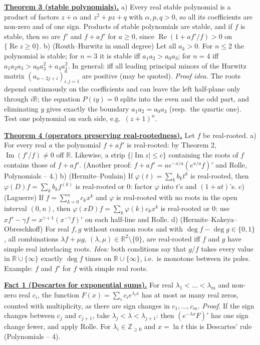 \documentclass[11pt,a4paper]{article}
\newcommand{\head}[1]{\par\medskip\noindent\textbf{\underline{#1}}\quad}
\begin{document}
\head{Theorem 3 (stable polynomials).} a) Every real stable polynomial is a product of factors
$z+\alpha$ and $z^2+pz+q$ with $\alpha,p,q>0$, so all its coefficients are non-zero and of one sign.
Products of stable polynomials are stable, and if $f$ is stable, then so are $f'$ and $f+af'$ for
$a\ge0$, since $\operatorname{Re}(1+af'/f)>0$ on $\{\operatorname{Re}z\ge0\}$.
b) (Routh--Hurwitz in small degree) Let all $a_k>0$. For $n\le2$ the polynomial is stable; for $n=3$
it is stable iff $a_1a_2>a_0a_3$; for $n=4$ iff $a_1a_2a_3>a_0a_3^2+a_4a_1^2$. In general: iff all
leading principal minors of the Hurwitz matrix $(a_{n-2j+i})_{i,j=1}^n$ are positive (may be quoted).
\emph{Proof idea.} The roots depend continuously on the coefficients and can leave the left
half-plane only through $i\mathbb{R}$; the equation $P(iy)=0$ splits into the even and the odd part,
and eliminating $y$ gives exactly the boundary $a_1a_2=a_0a_3$ (resp.\ the quartic one). Test one
polynomial on each side, e.g.\ $(z+1)^n$.

\head{Theorem 4 (operators preserving real-rootedness).} Let $f$ be real-rooted.
a) For every real $a$ the polynomial $f+af'$ is real-rooted: by Theorem 2, $\operatorname{Im}(f'/f)\neq0$ off
$\mathbb{R}$. Likewise, a strip $\{|\operatorname{Im}z|\le c\}$ containing the roots of $f$ contains those
of $f+af'$. (Another proof: $f+af'=ae^{-x/a}(e^{x/a}f)'$ and Rolle, Polynomials -- 4.)
b) (Hermite--Poulain) If $\varphi(t)=\sum_kb_kt^k$ is real-rooted, then
$\varphi(D)f=\sum_kb_kf^{(k)}$ is real-rooted or $0$: factor $\varphi$ into $t$'s and $(1+at)$'s.
c) (Laguerre) If $f=\sum_{k=0}^nc_kx^k$ and $\varphi$ is real-rooted with no roots in the open
interval $(0,n)$, then $\varphi(xD)f=\sum_k\varphi(k)c_kx^k$ is real-rooted or $0$: use
$xf'-\gamma f=x^{\gamma+1}(x^{-\gamma}f)'$ on each half-line and Rolle.
d) (Hermite--Kakeya--Obreschkoff) For real $f,g$ without common roots and with
$\deg f-\deg g\in\{0,1\}$, all combinations $\lambda f+\mu g$, $(\lambda,\mu)\in\mathbb{R}^2\setminus\{0\}$,
are real-rooted iff $f$ and $g$ have simple real interlacing roots. \emph{Idea:} both conditions
say that $g/f$ takes every value in $\mathbb{R}\cup\{\infty\}$ exactly $\deg f$ times on
$\mathbb{R}\cup\{\infty\}$, i.e.\ is monotone between its poles. Example: $f$ and $f'$ for $f$ with simple real roots.

\head{Fact 1 (Descartes for exponential sums).} For real $\lambda_1<\dots<\lambda_m$ and non-zero real
$c_i$, the function $F(x)=\sum_ic_ie^{\lambda_ix}$ has at most as many real zeros, counted with
multiplicity, as there are sign changes in $c_1,\dots,c_m$. \emph{Proof.} If the sign changes between
$c_j$ and $c_{j+1}$, take $\lambda_j<\lambda<\lambda_{j+1}$: then $(e^{-\lambda x}F)'$ has one sign change
fewer, and apply Rolle. For $\lambda_i\in\mathbb{Z}_{\ge0}$ and $x=\ln t$ this is Descartes' rule
(Polynomials -- 4).
\end{document}
